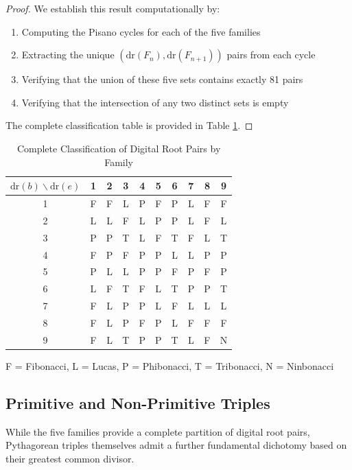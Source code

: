 \documentclass[12pt]{article}
\begin{document}
\begin{proof}
We establish this result computationally by:
\begin{enumerate}
\item Computing the Pisano cycles for each of the five families
\item Extracting the unique $(\text{dr}(F_n), \text{dr}(F_{n+1}))$ pairs from each cycle
\item Verifying that the union of these five sets contains exactly 81 pairs
\item Verifying that the intersection of any two distinct sets is empty
\end{enumerate}

The complete classification table is provided in Table \ref{tab:classification}.
\end{proof}

\begin{table}[h!]
\centering
\caption{Complete Classification of Digital Root Pairs by Family}
\label{tab:classification}
\small
\begin{tabular}{c|ccccccccc}
\toprule
$\text{dr}(b) \backslash \text{dr}(e)$ & 1 & 2 & 3 & 4 & 5 & 6 & 7 & 8 & 9 \\
\midrule
1 & F & F & L & P & F & P & L & F & F \\
2 & L & L & F & L & P & P & L & F & L \\
3 & P & P & T & L & F & T & F & L & T \\
4 & F & P & F & P & P & L & L & P & P \\
5 & P & L & L & P & P & F & P & F & P \\
6 & L & F & T & F & L & T & P & P & T \\
7 & F & L & P & P & L & F & L & L & L \\
8 & F & L & P & F & P & L & F & F & F \\
9 & F & L & T & P & P & T & L & F & N \\
\bottomrule
\end{tabular}

\vspace{0.2cm}
\small{F = Fibonacci, L = Lucas, P = Phibonacci, T = Tribonacci, N = Ninbonacci}
\end{table}

\subsection{Primitive and Non-Primitive Triples}

While the five families provide a complete partition of digital root pairs, Pythagorean triples themselves admit a further fundamental dichotomy based on their greatest common divisor.
\end{document}
